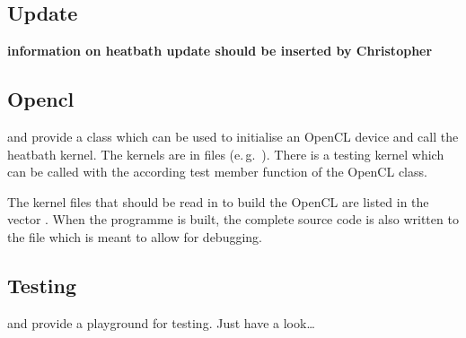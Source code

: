 \subsection{Update}
{\bf information on heatbath update should be inserted by Christopher}

\subsection{Opencl}
 and  provide a class  which can be used to initialise an OpenCL device and call the heatbath kernel. The kernels are in  files (e.\,g.\ ). There is a testing kernel which can be called with the according test member function of the OpenCL class. 

The kernel files that should be read in to build the OpenCL  are listed in the  vector . When the programme is built, the complete source code is also written to the file  which is meant to allow for debugging.

\subsection{Testing}
 and  provide a playground for testing. Just have a look\ldots
